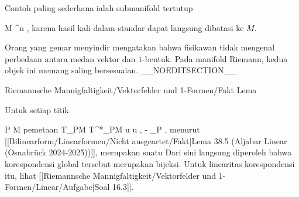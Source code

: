 Contoh paling sederhana ialah submanifold tertutup

\mavergleichskette
{\vergleichskette
{M
}
{ \subseteq }{ \R^n
}
{  }{
}
{    }{
}
{   }{
}
}
{}{}{,}
karena hasil kali dalam standar dapat langsung dibatasi ke $M$.


Orang yang gemar menyindir mengatakan bahwa fisikawan tidak mengenal perbedaan antara medan vektor dan $1$-bentuk. Pada manifold Riemann, kedua objek ini memang saling bersesuaian.
__NOEDITSECTION__

{Riemannsche Mannigfaltigkeit/Vektorfelder und 1-Formen/Fakt}
{Lema}
{}
{

\faktzusatz {}
\faktzusatz {}

}
{

Untuk setiap titik

\mavergleichskette
{\vergleichskette
{P
}
{ \in }{ M
}
{  }{
}
{    }{
}
{   }{
}
}
{}{}{}
pemetaan
\maabbeledisp {} {T_PM} {T^*_PM
} { u } { \left\langle  u  ,  -  \right\rangle_P
} {,}
menurut
[[Bilinearform/Linearformen/Nicht ausgeartet/Fakt|Lema 38.5 (Aljabar Linear (Osnabrück 2024-2025))]],
merupakan suatu
Dari sini langsung diperoleh bahwa korespondensi global tersebut merupakan bijeksi. Untuk linearitas korespondensi itu, lihat
[[Riemannsche Mannigfaltigkeit/Vektorfelder und 1-Formen/Linear/Aufgabe|Soal 16.3]].

}

